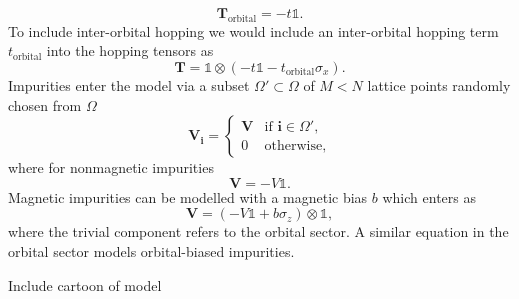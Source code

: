 \begin{equation}
\bm{T}_\text{orbital}= -t \mathbb{1}.
\end{equation}
To include inter-orbital hopping we would include an inter-orbital hopping term $t_\text{orbital}$ into the hopping tensors as
\begin{equation}
\bm{T}= \mathbb{1}\otimes \left(-t\mathbb{1}-t_\text{orbital} \sigma_x\right).
\end{equation}
Impurities enter the model via a subset $\Omega'\subset\Omega$ of $M<N$ lattice points randomly chosen from $\Omega$
\begin{equation}
\bm{V}_\mathbf{i} = 
\begin{cases}
\bm{V} &\text{if } \mathbf{i}\in\Omega',\\
0 &\text{otherwise},
\end{cases}
\end{equation}
where for nonmagnetic impurities
\begin{equation}
\bm{V}=-V\mathbb{1}.
\end{equation} 
Magnetic impurities can be modelled with a magnetic bias $b$ which enters as
\begin{equation}
\bm{V}=(-V\mathbb{1}+b\sigma_z)\otimes\mathbb{1},
\end{equation}
where the trivial component refers to the orbital sector. A similar equation in the orbital sector models orbital-biased impurities.

{\color{red}Include cartoon of model}

